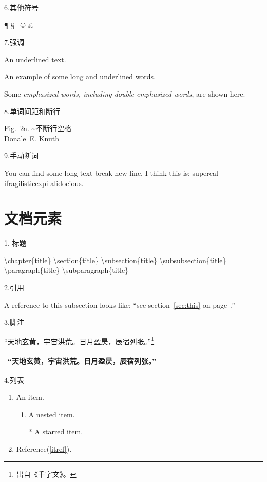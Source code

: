 \documentclass[12pt,UTF8]{ctexart}%
\begin{document}
6.其他符号\par
\P{} \S{} \dag{} \ddag{}\
\copyright{} \pounds{}\
\textasteriskcentered\
\textperiodcentered\
\textbullet\
\textregistered{} \texttrademark


\newpage

7.强调\par
An \underline{underlined} text.\par
An example of \uline{some long and underlined words.}\par

Some \emph{emphasized words,
including \emph{double-emphasized}
words}, are shown here.


8.单词间距和断行\par
Fig.~2a. \~{}不断行空格\\
Donale~E. Knuth

9.手动断词\par
You can find some long text break new line. I think this is: su\-per\-cal\-%
i\-frag\-i\-lis\-tic\-ex\-pi\-%
al\-i\-do\-cious.


\newpage
\section{文档元素}

1. 标题\par
\textbackslash chapter\{title\} \textbackslash section\{title\} \textbackslash subsection\{title\}
\textbackslash subsubsection\{title\} \textbackslash paragraph\{title\} \textbackslash subparagraph\{title\}


2.引用\par
A reference to this subsection
\label{sec:this} looks like:
``see section~\ref{sec:this} on
page~\pageref{sec:this}.''

3.脚注\par
“天地玄黄，宇宙洪荒。日月盈昃，辰宿列张。”\footnote{出自《千字文》。}\par
\par
\begin{tabular}{l}
\hline
“天地玄黄，宇宙洪荒。日月盈昃，辰宿列张。”\footnotemark \\
\hline
\end{tabular}
 \par


4.列表\par
\begin{enumerate}
\item An item.
\begin{enumerate}
\item A nested item.\label{itref}
\item[*] A starred item.
\end{enumerate}
\item Reference(\ref{itref}).
\end{enumerate}\par
\end{document}
